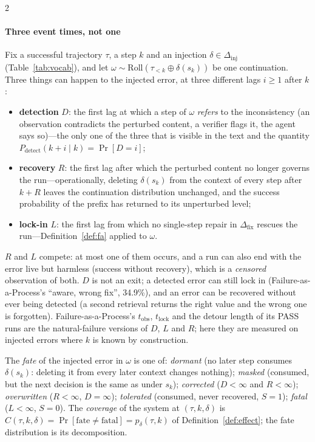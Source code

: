 \begin{multicols}{2}
\paragraph{Three event times, not one} Fix a successful trajectory $\tau$, a step $k$ and an injection $\delta\in\Delta_{\mathrm{inj}}$ (Table~\ref{tab:vocab}), and let $\omega\sim\mathrm{Roll}(\tau_{<k}\oplus\delta(s_k))$ be one continuation. Three things can happen to the injected error, at three different lags $i\ge1$ after $k$:
\begin{itemize}[leftmargin=1.1em]
\item \textbf{detection} $D$: the first lag at which a step of $\omega$ \emph{refers} to the inconsistency (an observation contradicts the perturbed content, a verifier flags it, the agent says so)---the only one of the three that is visible in the text and the quantity $P_{\mathrm{detect}}(k{+}i\mid k)=\Pr[D{=}i]$;
\item \textbf{recovery} $R$: the first lag after which the perturbed content no longer governs the run---operationally, deleting $\delta(s_k)$ from the context of every step after $k{+}R$ leaves the continuation distribution unchanged, and the success probability of the prefix has returned to its unperturbed level;
\item \textbf{lock-in} $L$: the first lag from which no single-step repair in $\Delta_{\mathrm{fix}}$ rescues the run---Definition~\ref{def:fa} applied to $\omega$.
\end{itemize}
$R$ and $L$ compete: at most one of them occurs, and a run can also end with the error live but harmless (success without recovery), which is a \emph{censored} observation of both. $D$ is not an exit; a detected error can still lock in (Failure-as-a-Process's ``aware, wrong fix'', 34.9\%), and an error can be recovered without ever being detected (a second retrieval returns the right value and the wrong one is forgotten). Failure-as-a-Process's $t_{\mathrm{obs}}$, $t_{\mathrm{lock}}$ and the detour length of its PASS runs are the natural-failure versions of $D$, $L$ and $R$; here they are measured on injected errors where $k$ is known by construction.

\begin{definition}\label{def:fate}
The \emph{fate} of the injected error in $\omega$ is one of: \emph{dormant} (no later step consumes $\delta(s_k)$: deleting it from every later context changes nothing); \emph{masked} (consumed, but the next decision is the same as under $s_k$); \emph{corrected} ($D<\infty$ and $R<\infty$); \emph{overwritten} ($R<\infty$, $D=\infty$); \emph{tolerated} (consumed, never recovered, $S{=}1$); \emph{fatal} ($L<\infty$, $S{=}0$). The \emph{coverage} of the system at $(\tau,k,\delta)$ is $C(\tau,k,\delta)=\Pr[\text{fate}\neq\text{fatal}]=p_\delta(\tau,k)$ of Definition~\ref{def:effect}; the fate distribution is its decomposition.
\end{definition}


\end{multicols}
